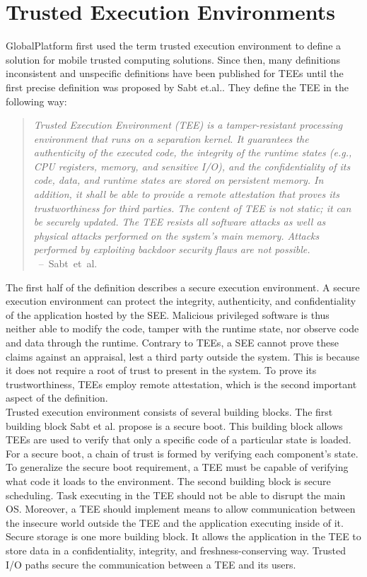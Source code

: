 \section{Trusted Execution Environments}
\label{sec:state:tee}

GlobalPlatform first used the term trusted execution environment to define a
solution for mobile trusted computing solutions.\cite{globaltee} Since then,
many definitions inconsistent and unspecific definitions have been published for
TEEs until the first precise definition was proposed by Sabt
et.al.\cite{sabt2015trusted}. They define the TEE in the following way:
\begin{quote}
    \textit{Trusted Execution Environment (TEE) is a tamper-resistant processing
        environment that runs on a separation kernel. It guarantees the authenticity of
        the executed code, the integrity of the runtime states (e.g., CPU registers,
        memory, and sensitive I/O), and the confidentiality of its code, data, and
        runtime states are stored on persistent memory. In addition, it shall be able
        to provide a remote attestation that proves its trustworthiness for third
        parties. The content of TEE is not static; it can be securely updated. The TEE
        resists all software attacks as well as physical attacks performed on the
        system's main memory. Attacks performed by exploiting backdoor security flaws
        are not possible. \\
    } \mbox{ -- Sabt et al.\cite{sabt2015trusted}}
\end{quote}

The first half of the definition describes a secure execution environment. A
secure execution environment can protect the integrity, authenticity, and
confidentiality of the application hosted by the SEE. Malicious privileged
software is thus neither able to modify the code, tamper with the runtime state,
nor observe code and data through the runtime. Contrary to TEEs, a SEE cannot
prove these claims against an appraisal, lest a third party outside the system.
This is because it does not require a root of trust to present in the system. To
prove its trustworthiness, TEEs employ remote attestation, which is the second
important aspect of the definition.\\

Trusted execution environment consists of several building blocks. The first
building block Sabt et al. propose is a secure boot. This building block allows
TEEs are used to verify that only a specific code of a particular state is
loaded. For a secure boot, a chain of trust is formed by verifying each
component's state. To generalize the secure boot requirement, a TEE must be
capable of verifying what code it loads to the environment. The second building
block is secure scheduling. Task executing in the TEE should not be able to
disrupt the main OS. Moreover, a TEE should implement means to allow
communication between the insecure world outside the TEE and the application
executing inside of it. Secure storage is one more building block. It allows the
application in the TEE to store data in a confidentiality, integrity, and
freshness-conserving way. Trusted I/O paths secure the communication between a
TEE and its users.

